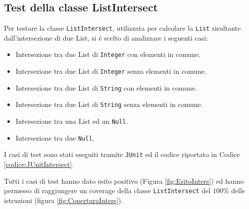 \subsection{Test della classe ListIntersect}
Per testare la classe \verb|ListIntersect|, utilizzata per calcolare la \verb|List| risultante dall'intersezione di due List, si è scelto di analizzare i seguenti casi:
\begin{itemize}
	\item Intersezione tra due List di \verb|Integer| con elementi in comune.
	\item Intersezione tra due List di \verb|Integer| senza elementi in comune.
	\item Intersezione tra due List di \verb|String| con elementi in comune.
	\item Intersezione tra due List di \verb|String| senza elementi in comune.
	\item Intersezione tra una List ed un \verb|Null|.
	\item Intersezione tra due \verb|Null|.
\end{itemize}
\noindent
I casi di test sono stati eseguiti tramite \verb|JUnit| ed il codice riportato in Codice \ref{codice:JUnitIntersect}.
\lstset{
    caption=Casi JUnit per il test della classe ListIntersect,
    label=codice:JUnitIntersect
 }


\noindent
Tutti i casi di test hanno dato esito positivo (Figura \ref{fig:EsitoInters}) ed hanno permesso di raggiungere un coverage della classe \verb|ListIntersect| del $100\%$ delle istruzioni (figura \ref{fig:CoperturaInters}).
